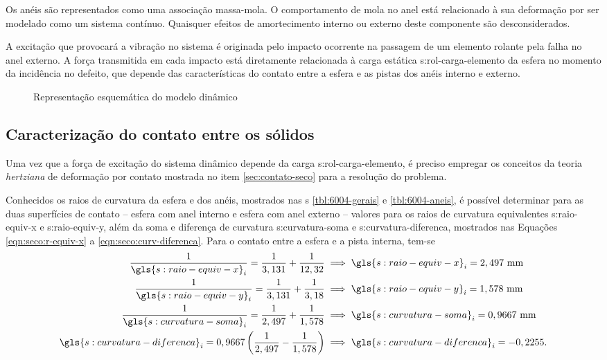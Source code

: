 \documentclass[12pt,oneside,english,brazil,lmodern,siglas,simbolos,cite=num]{ucsmonograph}
\begin{document}
	Os anéis são representados como uma associação massa-mola.
	O comportamento de mola no anel está relacionado à sua deformação por ser modelado como um sistema contínuo.
	Quaisquer efeitos de amortecimento interno ou externo deste componente são desconsiderados.
	
	A excitação que provocará a vibração no sistema é originada pelo impacto ocorrente na passagem de um elemento rolante pela falha no anel externo.
	A força transmitida em cada impacto está diretamente relacionada à carga estática \gls{s:rol-carga-elemento} da esfera no momento da incidência no defeito, que depende das características do contato entre a esfera e as pistas dos anéis interno e externo.
		
	\begin{figure}[t]
		\caption{Representação esquemática do modelo dinâmico}
		\label{fig:modelo-dinamico}
	\end{figure}
	
	\subsection{Caracterização do contato entre os sólidos}
	Uma vez que a força de excitação do sistema dinâmico depende da carga \gls{s:rol-carga-elemento}, é preciso empregar os conceitos da teoria \emph{hertziana} de deformação por contato mostrada no item \ref{sec:contato-seco} para a resolução do problema.
	
	Conhecidos os raios de curvatura da esfera e dos anéis, mostrados nas \tablename s \ref{tbl:6004-gerais} e \ref{tbl:6004-aneis}, é possível determinar para as duas superfícies de contato -- esfera com anel interno e esfera com anel externo -- valores para os raios de curvatura equivalentes \gls{s:raio-equiv-x} e \gls{s:raio-equiv-y}, além da soma e diferença de curvatura \gls{s:curvatura-soma} e \gls{s:curvatura-diferenca}, mostrados nas Equações \ref{eqn:seco:r-equiv-x} a \ref{eqn:seco:curv-diferenca}.
	Para o contato entre a esfera e a pista interna, tem-se
	\begin{align*}
		\frac{1}{\gls{s:raio-equiv-x}_i} = \frac{1}{3,131} +
		\frac{1}{12,32} &\implies \gls{s:raio-equiv-x}_i =
		2,497\ \text{mm} \\
		\frac{1}{\gls{s:raio-equiv-y}_i} = \frac{1}{3,131} +
		\frac{1}{3,18} &\implies \gls{s:raio-equiv-y}_i =
		1,578\ \text{mm} \\
		\frac{1}{\gls{s:curvatura-soma}_i} = \frac{1}{2,497} +
		\frac{1}{1,578} &\implies \gls{s:curvatura-soma}_i =
		0,9667\ \text{mm}\\
		\gls{s:curvatura-diferenca}_i = 0,9667\left( 
		\frac{1}{2,497} - \frac{1}{1,578} \right) &\implies
		\gls{s:curvatura-diferenca}_i = -0,2255.
	\end{align*}
	
\end{document}
